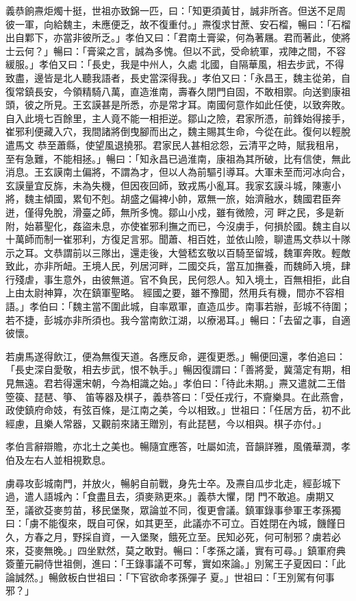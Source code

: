 \begin{pinyinscope}
 義恭餉燾炬燭十挺，世祖亦致錦一匹，曰：「知更須黃甘，誠非所吝。但送不足周彼一軍，向給魏主，未應便乏，故不復重付。」燾復求甘蔗、安石榴，暢曰：「石榴出自鄴下，亦當非彼所乏。」孝伯又曰：「君南土膏粱，何為著屩。君而著此，使將士云何？」暢曰：「膏粱之言，誠為多愧。但以不武，受命統軍，戎陣之間，不容緩服。」孝伯又曰：「長史，我是中州人，久處
 北國，自隔華風，相去步武，不得致盡，邊皆是北人聽我語者，長史當深得我。」孝伯又曰：「永昌王，魏主從弟，自復常鎮長安，今領精騎八萬，直造淮南，壽春久閉門自固，不敢相禦。向送劉康祖頭，彼之所見。王玄謨甚是所悉，亦是常才耳。南國何意作如此任使，以致奔敗。自入此境七百餘里，主人竟不能一相拒逆。鄒山之險，君家所憑，前鋒始得接手，崔邪利便藏入穴，我間諸將倒曳腳而出之，魏主賜其生命，今從在此。復何以輕脫遣馬文
 恭至蕭縣，使望風退撓邪。君家民人甚相忿怨，云清平之時，賦我租帛，至有急難，不能相拯。」暢曰：「知永昌已過淮南，康祖為其所破，比有信使，無此消息。王玄謨南土偏將，不謂為才，但以人為前驅引導耳。大軍未至而河冰向合，玄謨量宜反旆，未為失機，但因夜回師，致戎馬小亂耳。我家玄謨斗城，陳憲小將，魏主傾國，累旬不剋。胡盛之偏裨小帥，眾無一旅，始濟融水，魏國君臣奔迸，僅得免脫，滑臺之師，無所多愧。鄒山小戍，雖有微險，河
 畔之民，多是新附，始慕聖化，姦盜未息，亦使崔邪利撫之而已，今沒虜手，何損於國。魏主自以十萬師而制一崔邪利，方復足言邪。聞蕭、相百姓，並依山險，聊遣馬文恭以十隊示之耳。文恭謂前以三隊出，還走後，大營嵇玄敬以百騎至留城，魏軍奔敗。輕敵致此，亦非所衄。王境人民，列居河畔，二國交兵，當互加撫養，而魏師入境，肆行殘虐，事生意外，由彼無道。官不負民，民何怨人。知入境土，百無相拒，此自上由太尉神算，次在鎮軍聖略。
 經國之要，雖不豫聞，然用兵有機，間亦不容相語。」孝伯曰：「魏主當不圍此城，自率眾軍，直造瓜步。南事若辦，彭城不待圍；若不捷，彭城亦非所須也。我今當南飲江湖，以療渴耳。」暢曰：「去留之事，自適彼懷。



 若虜馬遂得飲江，便為無復天道。各應反命，遲復更悉。」暢便回還，孝伯追曰：「長史深自愛敬，相去步武，恨不執手。」暢因復謂曰：「善將愛，冀蕩定有期，相見無遠。君若得還宋朝，今為相識之始。」孝伯曰：「待此未期。」燾又遣就二王借箜篌、琵琶、箏、
 笛等器及棋子，義恭答曰：「受任戎行，不齎樂具。在此燕會，政使鎮府命妓，有弦百條，是江南之美，今以相致。」世祖曰：「任居方岳，初不此經慮，且樂人常器，又觀前來諸王贈別，有此琵琶，今以相與。棋子亦付。」



 孝伯言辭辯贍，亦北土之美也。暢隨宜應答，吐屬如流，音韻詳雅，風儀華潤，孝伯及左右人並相視歎息。



 虜尋攻彭城南門，并放火，暢躬自前戰，身先士卒。及燾自瓜步北走，經彭城下過，遣人語城內：「食盡且去，須麥熟更來。」義恭大懼，閉
 門不敢追。虜期又至，議欲芟麥剪苗，移民堡聚，眾論並不同，復更會議。鎮軍錄事參軍王孝孫獨曰：「虜不能復來，既自可保，如其更至，此議亦不可立。百姓閉在內城，饑饉日久，方春之月，野採自資，一入堡聚，餓死立至。民知必死，何可制邪？虜若必來，芟麥無晚。」四坐默然，莫之敢對。暢曰：「孝孫之議，實有可尋。」鎮軍府典簽董元嗣侍世祖側，進曰：「王錄事議不可奪，實如來論。」別駕王子夏因曰：「此論誠然。」暢斂板白世祖曰：「下官欲命孝孫彈子
 夏。」世祖曰：「王別駕有何事邪？」




\end{pinyinscope}
